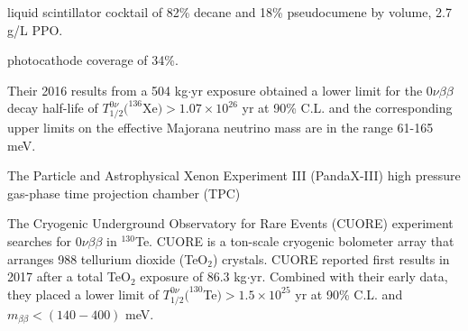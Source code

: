 liquid scintillator cocktail of 82\% decane and 18\% pseudocumene by volume, 2.7 g/L PPO.

photocathode coverage of 34\%.

 Their 2016 results from a 504 kg$\cdot$yr exposure obtained a lower limit for the $0\nu\beta\beta$ decay half-life of $T^{0\nu}_{1/2}(^{136}$Xe$)>1.07\times 10^{26}$ yr at 90\% C.L. and the corresponding upper limits on the effective Majorana neutrino mass are in the range 61-165 meV\cite{kamlandZen}.

The Particle and Astrophysical Xenon Experiment III (PandaX-III) 
high pressure gas-phase time projection chamber (TPC)  




The Cryogenic Underground Observatory for Rare Events (CUORE) experiment searches for $0\nu\beta\beta$ in $^{130}$Te. CUORE is a ton-scale cryogenic bolometer array that arranges 988 tellurium dioxide (TeO$_2$) crystals. CUORE reported first results in 2017 after a total TeO$_2$ exposure of 86.3 kg$\cdot$yr. Combined with their early data, they placed a lower limit of $T^{0\nu}_{1/2}(^{130}$Te$)>1.5\times 10^{25}$ yr at 90\% C.L. and $m_{\beta\beta}<(140-400)$  meV\cite{cuore}.

